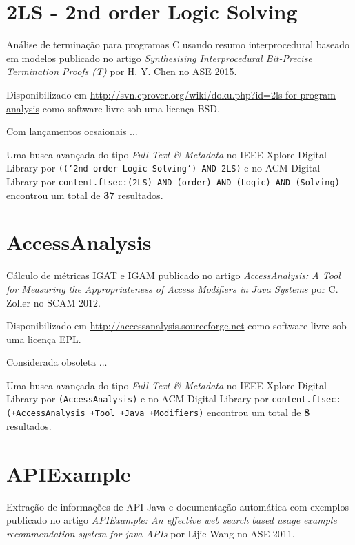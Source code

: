

\label{softwares-summary}

\section{2LS - 2nd order Logic Solving}

Análise de terminação para programas C usando resumo interprocedural baseado em modelos
publicado no artigo {\it Synthesising Interprocedural Bit-Precise Termination Proofs (T)}
por H. Y. Chen
no ASE 2015.

Disponibilizado em \url{http://svn.cprover.org/wiki/doku.php?id=2ls for program analysis}
como software livre
sob uma licença BSD.

Com lançamentos ocsaionais ...


Uma busca avançada do tipo {\it Full Text \& Metadata} no IEEE Xplore Digital Library por
\texttt{(('2nd order Logic Solving') AND 2LS)}
e no ACM Digital Library por
\texttt{content.ftsec:(2LS) AND (order) AND (Logic) AND (Solving)}
encontrou um total de
{\bf 37}
resultados.

\section{AccessAnalysis}

Cálculo de métricas IGAT e IGAM
publicado no artigo {\it AccessAnalysis: A Tool for Measuring the Appropriateness of Access Modifiers in Java Systems}
por C. Zoller
no SCAM 2012.

Disponibilizado em \url{http://accessanalysis.sourceforge.net}
como software livre
sob uma licença EPL.

Considerada obsoleta ...


Uma busca avançada do tipo {\it Full Text \& Metadata} no IEEE Xplore Digital Library por
\texttt{(AccessAnalysis)}
e no ACM Digital Library por
\texttt{content.ftsec:(+AccessAnalysis +Tool +Java +Modifiers)}
encontrou um total de
{\bf 8}
resultados.

\section{APIExample}

Extração de informações de API Java e documentação automática com exemplos
publicado no artigo {\it APIExample: An effective web search based usage example recommendation system for java APIs}
por Lijie Wang
no ASE 2011.

